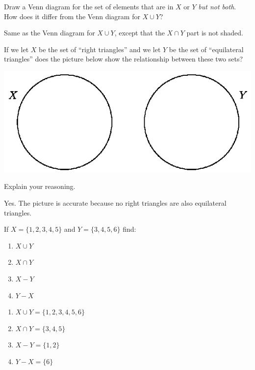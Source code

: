 \documentclass{ximera}
\begin{document}
\begin{problem}
Draw a Venn diagram for the set of elements that are in $X$ or $Y$ \emph{but not both}. 
How does it differ from the Venn diagram for $X\cup Y$?  
\begin{freeResponse}
Same as the Venn diagram for $X\cup Y$, except that the $X\cap Y$ part is not shaded.  
\end{freeResponse}
\end{problem}

\begin{problem}
If we let $X$ be the set of ``right triangles'' and we let $Y$ be the set of ``equilateral triangles'' does the picture below show the relationship between these two sets?
\begin{image}
  \includegraphics[scale=0.6]{set4.png}
\end{image}
Explain your reasoning.
\begin{freeResponse}
Yes.  The picture is accurate because no right triangles are also equilateral triangles.  
\end{freeResponse}
\end{problem}

\begin{problem}
If $X = \{1,2,3,4,5\}$ and $Y = \{3,4,5,6\}$ find:
\begin{enumerate}
\item $X\cup Y$
\item $X\cap Y$
\item $X-Y$
\item $Y-X$
\end{enumerate}
\begin{freeResponse}
\begin{enumerate}
\item $X\cup Y = \{1,2,3,4,5,6\}$
\item $X\cap Y = \{3,4,5\}$
\item $X-Y = \{1,2\}$
\item $Y-X = \{6\}$
\end{enumerate}
\end{freeResponse}
\end{problem}
\end{document}
